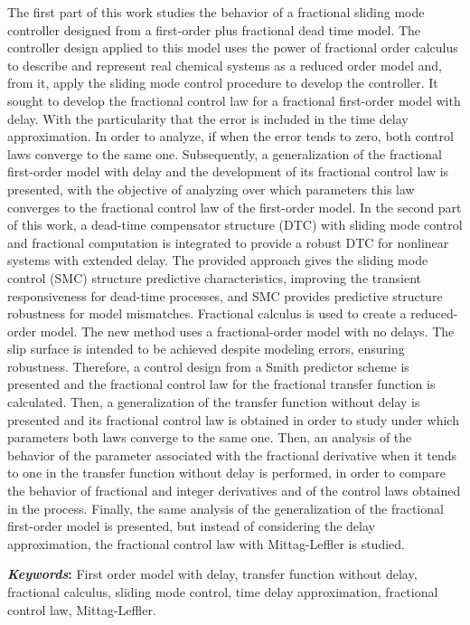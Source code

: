 \documentclass[a4paper, 12pt]{report}
\begin{document}
The first part of this work studies the behavior of a fractional sliding mode controller designed from a first-order plus fractional dead time model. The controller design applied to this model uses the power of fractional order calculus to describe and represent real chemical systems as a reduced order model and, from it, apply the sliding mode control procedure to develop the controller. It sought to develop the fractional control law for a fractional first-order model with delay. With the particularity that the error is included in the time delay approximation. In order to analyze, if when the error tends to zero, both control laws converge to the same one. 
Subsequently, a generalization of the fractional first-order model with delay and the development of its fractional control law is presented, with the objective of analyzing over which parameters this law converges to the fractional control law of the first-order model. 
In the second part of this work, a dead-time compensator structure (DTC) with sliding mode control and fractional computation is integrated to provide a robust DTC for nonlinear systems with extended delay. The provided approach gives the sliding mode control (SMC) structure predictive characteristics, improving the transient responsiveness for dead-time processes, and SMC provides predictive structure robustness for model mismatches. Fractional calculus is used to create a reduced-order model. The new method uses a fractional-order model with no delays. The slip surface is intended to be achieved despite modeling errors, ensuring robustness. Therefore, a control design from a Smith predictor scheme is presented and the fractional control law for the fractional transfer function is calculated. Then, a generalization of the transfer function without delay is presented and its fractional control law is obtained in order to study under which parameters both laws converge to the same one. Then, an analysis of the behavior of the parameter associated with the fractional derivative when it tends to one in the transfer function without delay is performed, in order to compare the behavior of fractional and integer derivatives and of the control laws obtained in the process. Finally, the same analysis of the generalization of the fractional first-order model is presented, but instead of considering the delay approximation, the fractional control law with Mittag-Leffler is studied. 

\textbf{\textit{Keywords}:} First order model with delay, transfer function without delay, fractional calculus, sliding mode control, time delay approximation, fractional control law, Mittag-Leffler.
\end{document}
